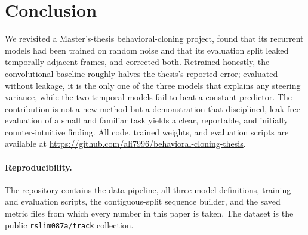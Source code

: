 \documentclass[11pt]{article}
\begin{document}
\section{Conclusion}

We revisited a Master's-thesis behavioral-cloning project, found that its recurrent
models had been trained on random noise and that its evaluation split leaked
temporally-adjacent frames, and corrected both. Retrained honestly, the convolutional
baseline roughly halves the thesis's reported error; evaluated without leakage, it is
the only one of the three models that explains any steering variance, while the two
temporal models fail to beat a constant predictor. The contribution is not a new
method but a demonstration that disciplined, leak-free evaluation of a small and
familiar task yields a clear, reportable, and initially counter-intuitive finding.
All code, trained weights, and evaluation scripts are available at
\url{https://github.com/ali7996/behavioral-cloning-thesis}.

\paragraph{Reproducibility.}
The repository contains the data pipeline, all three model definitions, training and
evaluation scripts, the contiguous-split sequence builder, and the saved metric
files from which every number in this paper is taken. The dataset is the public
\texttt{rslim087a/track} collection.



\end{document}
